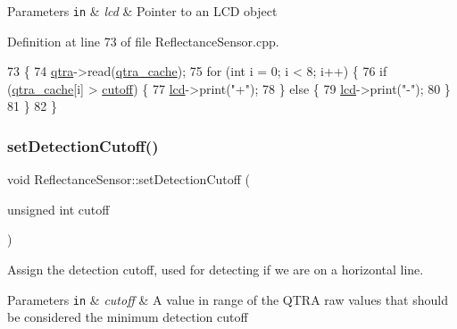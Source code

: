 \begin{DoxyParams}[1]{Parameters}
\mbox{\tt in}  & {\em lcd} & Pointer to an L\+CD object \\
\hline
\end{DoxyParams}


Definition at line 73 of file Reflectance\+Sensor.\+cpp.


\begin{DoxyCode}
73                                                    \{
74     \hyperlink{class_reflectance_sensor_a1eb0a090b619705b0234cea224400829}{qtra}->read(\hyperlink{class_reflectance_sensor_ab4b708129419215a57eec3b0af611542}{qtra\_cache});
75     \textcolor{keywordflow}{for} (\textcolor{keywordtype}{int} i = 0; i < 8; i++) \{
76         \textcolor{keywordflow}{if} (\hyperlink{class_reflectance_sensor_ab4b708129419215a57eec3b0af611542}{qtra\_cache}[i] > \hyperlink{class_reflectance_sensor_ab690b7c2e5b1ba69c0068841fe916dbd}{cutoff}) \{
77             \hyperlink{rbe2001_8ino_a4cbb289153633c01a1584b3aa0d9a0a2}{lcd}->print(\textcolor{stringliteral}{"+"});
78         \} \textcolor{keywordflow}{else} \{
79             \hyperlink{rbe2001_8ino_a4cbb289153633c01a1584b3aa0d9a0a2}{lcd}->print(\textcolor{stringliteral}{"-"});
80         \}
81     \}
82 \}
\end{DoxyCode}
\mbox{\label{class_reflectance_sensor_a49851d00301cadc84ac53e747e49971b}} 
\subsubsection{\texorpdfstring{set\+Detection\+Cutoff()}{setDetectionCutoff()}}
{\footnotesize\ttfamily void Reflectance\+Sensor\+::set\+Detection\+Cutoff (\begin{DoxyParamCaption}\item[{unsigned int}]{cutoff }\end{DoxyParamCaption})}



Assign the detection cutoff, used for detecting if we are on a horizontal line. 


\begin{DoxyParams}[1]{Parameters}
\mbox{\tt in}  & {\em cutoff} & A value in range of the Q\+T\+RA raw values that should be considered the minimum detection cutoff \\
\hline
\end{DoxyParams}


